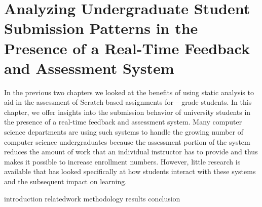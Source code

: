\chapter{Analyzing Undergraduate Student Submission Patterns in the Presence of
  a Real-Time Feedback and Assessment System}
\label{chap:feedback}

\def\currentprefix{feedback}

In the previous two chapters we looked at the benefits of using static analysis
to aid in the assessment of Scratch-based assignments for --
grade students. In this chapter, we offer insights into the submission behavior
of university students in the presence of a real-time feedback and assessment
system. Many computer science departments are using such systems to handle the
growing number of computer science undergraduates because the assessment
portion of the system reduces the amount of work that an individual instructor
has to provide and thus makes it possible to increase enrollment
numbers. However, little research is available that has looked specifically at
how students interact with these systems and the subsequent impact on learning.

\iffull
{introduction}
{relatedwork}
{methodology}
{results}
{conclusion}
\fi

